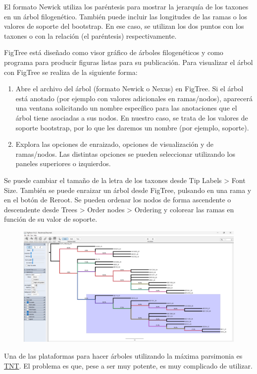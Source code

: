 El formato Newick utiliza los paréntesis para mostrar la jerarquía de los taxones en un árbol filogenético. También puede incluir las longitudes de las ramas o los valores de soporte del bootstrap. En ese caso, se utilizan los dos puntos con los taxones o con la relación (el paréntesis) respectivamente. 

FigTree está diseñado como visor gráfico de árboles filogenéticos y como programa para producir figuras listas para su publicación. Para visualizar el árbol con FigTree se realiza de la siguiente forma:
\begin{enumerate}
\item Abre el archivo del árbol (formato Newick o Nexus) en FigTree. Si el árbol está anotado (por ejemplo con valores adicionales en ramas/nodos), aparecerá una ventana solicitando un nombre específico para las anotaciones que el árbol tiene asociadas a sus nodos. En nuestro caso, se trata de los valores de soporte bootstrap, por lo que les daremos un nombre (por ejemplo, soporte).
\item Explora las opciones de enraizado, opciones de visualización y de ramas/nodos. Las distintas opciones se pueden seleccionar utilizando los paneles superiores o izquierdos. 
\end{enumerate}

Se puede cambiar el tamaño de la letra de los taxones desde Tip Labels > Font Size. También se puede enraizar un árbol desde FigTree, pulsando en una rama y en el botón de Reroot. Se pueden ordenar los nodos de forma ascendente o descendente desde Trees > Order nodes > Ordering y colorear las ramas en función de su valor de soporte. 

\begin{figure}[htbp]
\centering
\includegraphics[width = \linewidth]{figs/figtree.png}
\end{figure}

Una de las plataformas para hacer árboles utilizando la máxima parsimonia es \href{https://www.lillo.org.ar/phylogeny/tnt/}{TNT}. El problema es que, pese a ser muy potente, es muy complicado de utilizar.